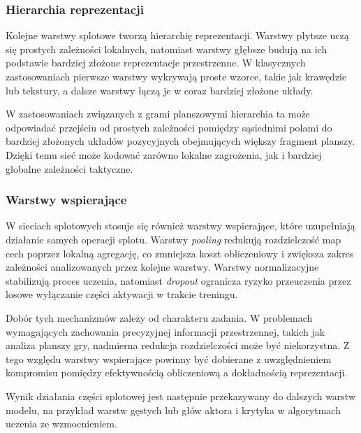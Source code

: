 \subsubsection*{Hierarchia reprezentacji}

Kolejne warstwy splotowe tworzą hierarchię reprezentacji. Warstwy płytsze uczą się prostych zależności lokalnych, natomiast warstwy głębsze budują na ich podstawie bardziej złożone reprezentacje przestrzenne. W klasycznych zastosowaniach pierwsze warstwy wykrywają proste wzorce, takie jak krawędzie lub tekstury, a dalsze warstwy łączą je w coraz bardziej złożone układy.

W zastosowaniach związanych z grami planszowymi hierarchia ta może odpowiadać przejściu od prostych zależności pomiędzy sąsiednimi polami do bardziej złożonych układów pozycyjnych obejmujących większy fragment planszy. Dzięki temu sieć może kodować zarówno lokalne zagrożenia, jak i bardziej globalne zależności taktyczne.

\subsubsection*{Warstwy wspierające}

W sieciach splotowych stosuje się również warstwy wspierające, które uzupełniają działanie samych operacji splotu. Warstwy \textit{pooling} redukują rozdzielczość map cech poprzez lokalną agregację, co zmniejsza koszt obliczeniowy i zwiększa zakres zależności analizowanych przez kolejne warstwy. Warstwy normalizacyjne stabilizują proces uczenia, natomiast \textit{dropout} ogranicza ryzyko przeuczenia przez losowe wyłączanie części aktywacji w trakcie treningu.

Dobór tych mechanizmów zależy od charakteru zadania. W problemach wymagających zachowania precyzyjnej informacji przestrzennej, takich jak analiza planszy gry, nadmierna redukcja rozdzielczości może być niekorzystna. Z tego względu warstwy wspierające powinny być dobierane z uwzględnieniem kompromisu pomiędzy efektywnością obliczeniową a dokładnością reprezentacji.

Wynik działania części splotowej jest następnie przekazywany do dalszych warstw modelu, na przykład warstw gęstych lub głów aktora i krytyka w algorytmach uczenia ze wzmocnieniem.

